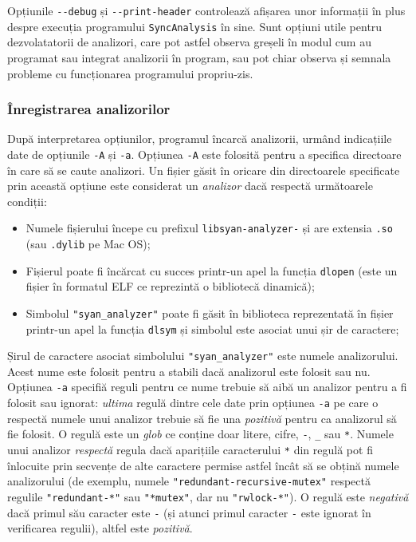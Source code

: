 Opțiunile \lstinline{--debug} și \lstinline{--print-header} controlează
afișarea unor informații în plus despre execuția programului
\lstinline{SyncAnalysis} în sine. Sunt opțiuni utile pentru
dezvolatatorii de analizori, care pot astfel observa greșeli în modul
cum au programat sau integrat analizorii în program, sau pot chiar
observa și semnala probleme cu funcționarea programului propriu-zis.

\subsubsection{Înregistrarea analizorilor}

După interpretarea opțiunilor, programul încarcă analizorii, urmând
indicațiile date de opțiunile \lstinline{-A} și \lstinline{-a}. Opțiunea
\lstinline{-A} este folosită pentru a specifica directoare în care să se
caute analizori. Un fișier găsit în oricare din directoarele specificate
prin această opțiune este considerat un \textit{analizor} dacă respectă
următoarele condiții:
\begin{itemize}
    \item Numele fișierului începe cu prefixul
    \lstinline{libsyan-analyzer-} și are extensia \lstinline{.so} (sau
    \lstinline{.dylib} pe Mac OS);
    \item Fișierul poate fi încărcat cu succes printr-un apel la funcția
    \lstinline{dlopen} (este un fișier în formatul ELF\cite{ELF} ce
    reprezintă o bibliotecă dinamică);
    \item Simbolul \lstinline{"syan_analyzer"} poate fi găsit în
    biblioteca reprezentată în fișier printr-un apel la funcția
    \lstinline{dlsym} și simbolul este asociat unui șir de caractere;
\end{itemize}
Șirul de caractere asociat simbolului \lstinline{"syan_analyzer"} este
numele analizorului. Acest nume este folosit pentru a stabili dacă
analizorul este folosit sau nu. Opțiunea \lstinline{-a} specifiă reguli
pentru ce nume trebuie să aibă un analizor pentru a fi folosit sau
ignorat: \textit{ultima} regulă dintre cele date prin opțiunea
\lstinline{-a} pe care o respectă numele unui analizor trebuie să fie
una \textit{pozitivă} pentru ca analizorul să fie folosit. O regulă este
un \textit{glob} ce conține doar litere, cifre, \lstinline{-},
\lstinline{_} sau \lstinline{*}. Numele unui analizor \textit{respectă}
regula dacă aparițiile caracterului \lstinline{*} din regulă pot fi
înlocuite prin secvențe de alte caractere permise astfel încât să se
obțină numele analizorului (de exemplu, numele
\lstinline{"redundant-recursive-mutex"} respectă regulile
\lstinline{"redundant-*"} sau \lstinline{"*mutex"}, dar nu
\lstinline{"rwlock-*"}). O regulă este \textit{negativă} dacă primul său
caracter este \lstinline{-} (și atunci primul caracter \lstinline{-}
este ignorat în verificarea regulii), altfel este \textit{pozitivă}.

